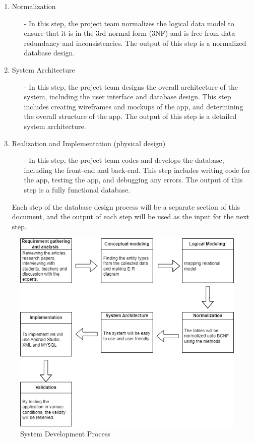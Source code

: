 \begin{enumerate}
\item Normalization
\begin{itemize}
     	\item[-] In this step, the project team normalizes the logical data model to ensure that it is in the 3rd normal form (3NF) and is free from data redundancy and inconsistencies. The output of this step is a normalized database design.
     \end{itemize}
\item System Architecture
\begin{itemize}
     	\item[-] In this step, the project team designs the overall architecture of the system, including the user interface and database design. This step includes creating wireframes and mockups of the app, and determining the overall structure of the app. The output of this step is a detailed system architecture.
     \end{itemize}
     
\item Realization and Implementation (physical design) 
\begin{itemize}
     	\item[-] In this step, the project team codes and develops the database, including the front-end and back-end. This step includes writing code for the app, testing the app, and debugging any errors. The output of this step is a fully functional database.
     \end{itemize}   
    
    
    Each step of the database design process will be a separate section of this document, and the output of each step will be used as the input for the next step.
\end{enumerate}


\begin{figure}[h]

\centering
\includegraphics[scale=.5]{sys}

\caption{System Development Process }
\end{figure}


